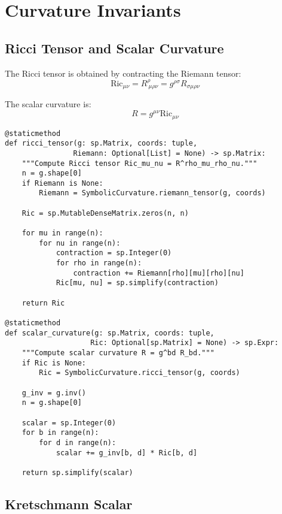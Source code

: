 \documentclass[11pt,a4paper]{article}
\theoremstyle{definition}
\theoremstyle{remark}
\newcommand{\Ric}{\text{Ric}}
\newcommand{\Scal}{R}
\begin{document}
\section{Curvature Invariants}

\subsection{Ricci Tensor and Scalar Curvature}

The Ricci tensor is obtained by contracting the Riemann tensor:
\begin{equation}
\Ric_{\mu\nu} = R^\rho_{\ \mu\rho\nu} = g^{\rho\sigma} R_{\sigma\mu\rho\nu}
\end{equation}

The scalar curvature is:
\begin{equation}
\Scal = g^{\mu\nu} \Ric_{\mu\nu}
\end{equation}

\begin{lstlisting}
@staticmethod
def ricci_tensor(g: sp.Matrix, coords: tuple, 
                Riemann: Optional[List] = None) -> sp.Matrix:
    """Compute Ricci tensor Ric_mu_nu = R^rho_mu_rho_nu."""
    n = g.shape[0]
    if Riemann is None:
        Riemann = SymbolicCurvature.riemann_tensor(g, coords)
    
    Ric = sp.MutableDenseMatrix.zeros(n, n)
    
    for mu in range(n):
        for nu in range(n):
            contraction = sp.Integer(0)
            for rho in range(n):
                contraction += Riemann[rho][mu][rho][nu]
            Ric[mu, nu] = sp.simplify(contraction)
    
    return Ric

@staticmethod
def scalar_curvature(g: sp.Matrix, coords: tuple, 
                    Ric: Optional[sp.Matrix] = None) -> sp.Expr:
    """Compute scalar curvature R = g^bd R_bd."""
    if Ric is None:
        Ric = SymbolicCurvature.ricci_tensor(g, coords)
    
    g_inv = g.inv()
    n = g.shape[0]
    
    scalar = sp.Integer(0)
    for b in range(n):
        for d in range(n):
            scalar += g_inv[b, d] * Ric[b, d]
    
    return sp.simplify(scalar)
\end{lstlisting}

\subsection{Kretschmann Scalar}
\end{document}
